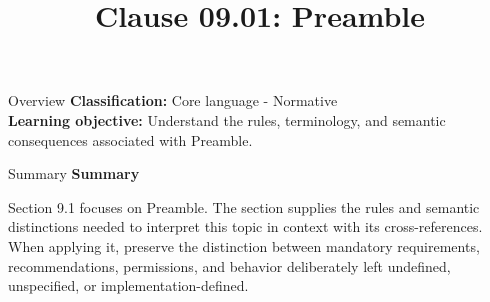 \documentclass[10pt,letterpaper]{article}
\title{Clause 09.01: Preamble}
\author{}
\date{}
\begin{document}
\maketitle
\begin{CornellOverviewBox}{Overview}
\textbf{Classification:} Core language - Normative\\[2pt]
\textbf{Learning objective:} Understand the rules, terminology, and semantic consequences associated with Preamble.
\end{CornellOverviewBox}\begin{CornellSummaryBox}{Summary}
{\sffamily\bfseries\color{Accent} Summary}\par\vspace{3pt}Section 9.1 focuses on Preamble. The section supplies the rules and semantic distinctions needed to interpret this topic in context with its cross-references. When applying it, preserve the distinction between mandatory requirements, recommendations, permissions, and behavior deliberately left undefined, unspecified, or implementation-defined.
\end{CornellSummaryBox}
\end{document}
